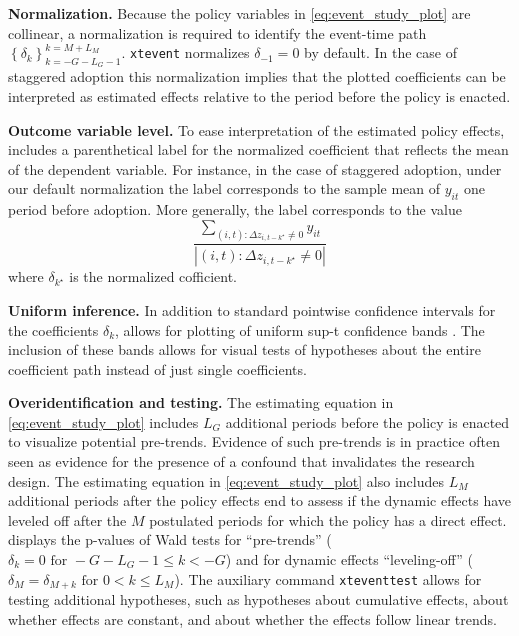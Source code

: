 \documentclass[bib]{./sty/statapress}
\begin{document}
\noindent \textbf{Normalization.}
Because the policy variables in \eqref{eq:event_study_plot} are collinear, a normalization is required to identify the event-time path $\left\{ \delta_k \right\}_{k = - G - L_G - 1}^{k = M + L_M}$.
\texttt{xtevent} normalizes $\delta_{-1}=0$ by default. In the case of staggered adoption this normalization implies that  the plotted coefficients can be interpreted as estimated effects relative to the period before the policy is enacted.

\noindent \textbf{Outcome variable level.}
To ease interpretation of the estimated policy effects, \xtevent includes a parenthetical label for the normalized coefficient that reflects the mean of the dependent variable.
For instance, in the case of staggered adoption, under our default normalization the label corresponds to the sample mean of $y_{it}$ one period before adoption.
More generally, the label corresponds to the value $$\frac{\sum_{(i,t): \Delta z_{i,t-k^{\star}} \neq 0} y_{it}}{ \left| (i,t) : \Delta z_{i,t-k^{\star}} \neq 0 \right| }$$ where $\delta_{k^{\star}}$ is the normalized cofficient.

\begin{sloppypar}
\noindent \textbf{Uniform inference.}
In addition to standard pointwise confidence intervals for the coefficients $\delta_k$, \xtevent allows for plotting of uniform sup-t confidence bands \citep{freyberger2018uniform,montiel2019simultaneous}.
The inclusion of these bands allows for visual tests of hypotheses about the entire coefficient path instead of just single coefficients.
\end{sloppypar}

\noindent \textbf{Overidentification and testing.}
The estimating equation in \eqref{eq:event_study_plot} includes $L_G$ additional periods before the policy is enacted to visualize potential pre-trends.
Evidence of such pre-trends is in practice often seen as evidence for the presence of a confound that invalidates the research design.
The estimating equation in \eqref{eq:event_study_plot} also includes $L_M$ additional periods after the policy effects end to assess if the dynamic effects have leveled off after the $M$ postulated periods for which the policy has a direct effect.
\xtevent displays the p-values of Wald tests for ``pre-trends'' ($\delta_k = 0 \text{ for } -G - L_G - 1 \leq k < -G$) and for dynamic effects ``leveling-off'' ($ \delta_M =\delta_{M+k} \text{ for } 0 < k \leq L_M$).
The auxiliary command \texttt{xteventtest} allows for testing additional hypotheses, such as hypotheses about cumulative effects, about whether effects are constant, and about whether the effects follow linear trends.
\end{document}
